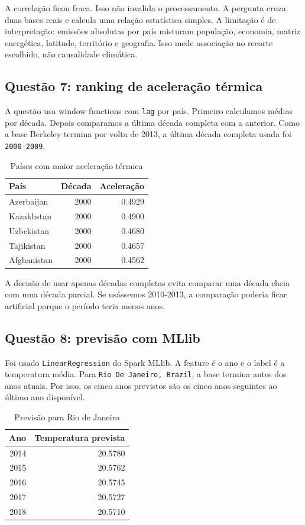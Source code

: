 \documentclass[12pt,a4paper]{article}
\begin{document}
A correlação ficou fraca. Isso não invalida o processamento. A pergunta cruza duas bases reais e calcula uma relação estatística simples. A limitação é de interpretação: emissões absolutas por país misturam população, economia, matriz energética, latitude, território e geografia. Isso mede associação no recorte escolhido, não causalidade climática.

\subsection{Questão 7: ranking de aceleração térmica}

A questão usa window functions com \texttt{lag} por país. Primeiro calculamos médias por década. Depois comparamos a última década completa com a anterior. Como a base Berkeley termina por volta de 2013, a última década completa usada foi \texttt{2000-2009}.

\begin{table}[H]
\centering
\caption{Países com maior aceleração térmica}
\begin{tabular}{lrr}
\toprule
País & Década & Aceleração \\
\midrule
Azerbaijan & 2000 & 0.4929 \\
Kazakhstan & 2000 & 0.4900 \\
Uzbekistan & 2000 & 0.4680 \\
Tajikistan & 2000 & 0.4657 \\
Afghanistan & 2000 & 0.4562 \\
\bottomrule
\end{tabular}
\end{table}

A decisão de usar apenas décadas completas evita comparar uma década cheia com uma década parcial. Se usássemos 2010-2013, a comparação poderia ficar artificial porque o período teria menos anos.

\subsection{Questão 8: previsão com MLlib}

Foi usado \texttt{LinearRegression} do Spark MLlib. A feature é o ano e o label é a temperatura média. Para \texttt{Rio De Janeiro, Brazil}, a base termina antes dos anos atuais. Por isso, os cinco anos previstos são os cinco anos seguintes ao último ano disponível.

\begin{table}[H]
\centering
\caption{Previsão para Rio de Janeiro}
\begin{tabular}{rr}
\toprule
Ano & Temperatura prevista \\
\midrule
2014 & 20.5780 \\
2015 & 20.5762 \\
2016 & 20.5745 \\
2017 & 20.5727 \\
2018 & 20.5710 \\
\bottomrule
\end{tabular}
\end{table}
\end{document}

